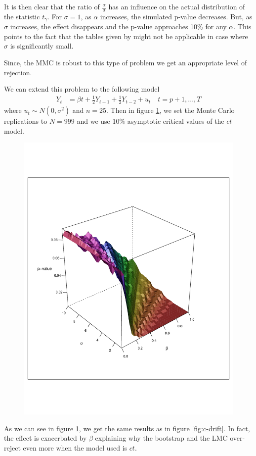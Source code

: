 \documentclass[]{article}\usepackage[]{graphicx}\usepackage[]{color}
\begin{document}
It is then clear that the ratio of $\frac{\alpha}{\sigma}$ has an influence on the actual distribution of the statistic $t_\gamma$. For $\sigma=1$, as $\alpha$ increases, the simulated p-value decreases. But, as $\sigma$ increases, the effect disappears and the p-value approaches 10\% for any $\alpha$. This points to the fact that the tables given by \cite{fuller_introduction_1976} might not be applicable in case where $\sigma$ is significantly small.

Since, the MMC is robust to this type of problem we get an appropriate level of rejection.

We can extend this problem to the following model
\begin{align}
	Y_t & = \beta t + \frac{1}{2}Y_{t-1} + \frac{1}{2}Y_{t-2} + u_t \quad t = p + 1, ... , T
\end{align}
where $u_t \sim N(0,\sigma^2)$ and $n=25$. Then in figure \ref{fig:ct-trend}, we set the Monte Carlo replications to $N=999$ and we use 10\% asymptotic critical values of the $ct$ model.

\begin{figure}[H]
	\centering
	\includegraphics[width=0.7\linewidth]{fig/ct-trend}
	\caption{}
	\label{fig:ct-trend}
\end{figure}

As we can see in figure \ref{fig:ct-trend}, we get the same results as in figure \ref{fig:c-drift}. In fact, the effect is exacerbated by $\beta$ explaining why the bootstrap and the LMC over-reject even more when the model used is $ct$.
\end{document}
